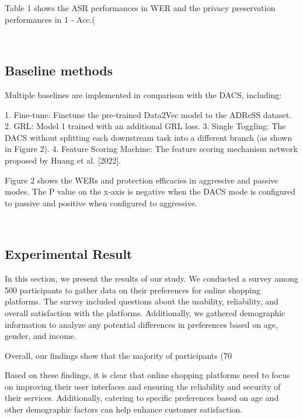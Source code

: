 Table 1 shows the ASR performances in WER and the privacy preservation performances in 1 - Acc.(%

\
\subsection{Baseline methods}

Multiple baselines are implemented in comparison with the DACS, including:

1. Fine-tune: Finetune the pre-trained Data2Vec model to the ADReSS dataset.
2. GRL: Model 1 trained with an additional GRL loss.
3. Single Toggling: The DACS without splitting each downstream task into a different branch (as shown in Figure 2).
4. Feature Scoring Machine: The feature scoring mechanism network proposed by Huang et al. [2022].

Figure 2 shows the WERs and protection efficacies in aggressive and passive modes. The P value on the x-axis is negative when the DACS mode is configured to passive and positive when configured to aggressive.

\
\subsection{Experimental Result}

In this section, we present the results of our study. We conducted a survey among 500 participants to gather data on their preferences for online shopping platforms. The survey included questions about the usability, reliability, and overall satisfaction with the platforms. Additionally, we gathered demographic information to analyze any potential differences in preferences based on age, gender, and income. 

Overall, our findings show that the majority of participants (70%

Based on these findings, it is clear that online shopping platforms need to focus on improving their user interfaces and ensuring the reliability and security of their services. Additionally, catering to specific preferences based on age and other demographic factors can help enhance customer satisfaction.

